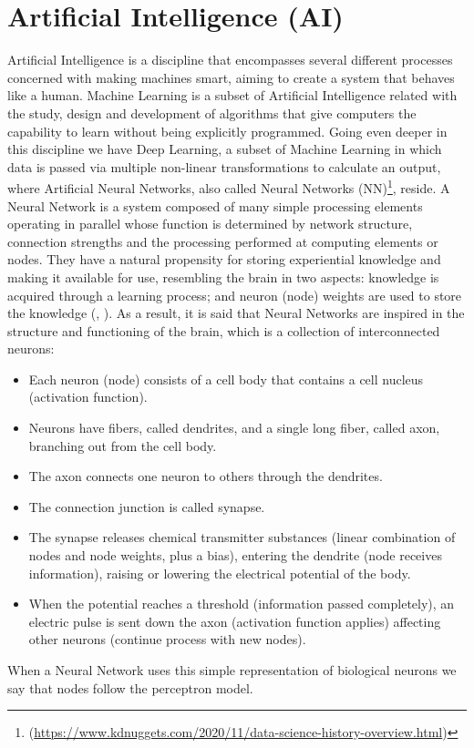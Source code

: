 %
%
%
%
%
%
%
%
%
%
%
%
%
%
%
%
%
%
%
%
%
%
%
%
%
%
%
%
%
%
%
%
\section{Artificial Intelligence (AI)}
Artificial Intelligence is a discipline that encompasses several different processes concerned with making machines smart, aiming to create a system that behaves like a human. Machine Learning is a subset of Artificial Intelligence related with the study, design and development of algorithms that give computers the capability to learn without being explicitly programmed. Going even deeper in this discipline we have Deep Learning, a subset of Machine Learning in which data is passed via multiple non-linear transformations to calculate an output, where Artificial Neural Networks, also called Neural Networks (NN)\footnote{(\url{https://www.kdnuggets.com/2020/11/data-science-history-overview.html})}, reside. A Neural Network is a system composed of many simple processing elements operating in parallel whose function is determined by network structure, connection strengths and the processing performed at computing elements or nodes. They have a natural propensity for storing experiential knowledge and making it available for use, resembling the brain in two aspects: knowledge is acquired through a learning process; and neuron (node) weights are used to store the knowledge
(\cite{DARPA}, \cite{Haykin}). %
As a result, it is said that Neural Networks are inspired in the structure and functioning of the brain, which is a collection of interconnected neurons:
\begin{itemize}
    \item Each neuron (node) consists of a cell body that contains a cell nucleus (activation function).
    \item Neurons have fibers, called dendrites, and a single long fiber, called axon, branching out from the cell body.
    \item The axon connects one neuron to others through the dendrites.
    \item The connection junction is called synapse.
    \item The synapse releases chemical transmitter substances (linear combination of nodes and node weights, plus a bias), entering the dendrite (node receives information), raising or lowering the electrical potential of the body.
    \item When the potential reaches a threshold (information passed completely), an electric pulse is sent down the axon (activation function applies) affecting other neurons (continue process with new nodes). 
\end{itemize} %
When a Neural Network uses this simple representation of biological neurons we say that nodes follow the perceptron model.\\

